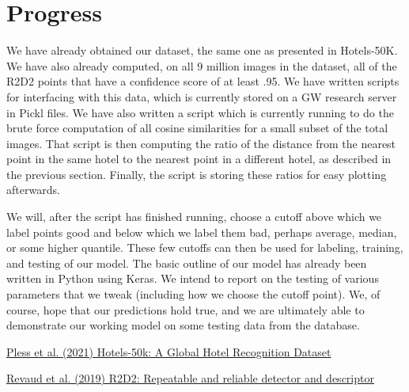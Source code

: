 \documentclass{scrartcl}
\begin{document}
\section{Progress}

We have already obtained our dataset, the same one as presented in Hotels-50K. We have also already computed, on all 9 million images in the dataset, all of the R2D2 points that have a confidence score of at least .95. We have written scripts for interfacing with this data, which is currently stored on a GW research server in Pickl files. We have also written a script which is currently running to do the brute force computation of all cosine similarities for a small subset of the total images. That script is then computing the ratio of the distance from the nearest point in the same hotel to the nearest point in a different hotel, as described in the previous section. Finally, the script is storing these ratios for easy plotting afterwards. 

We will, after the script has finished running, choose a cutoff above which we label points good and below which we label them bad, perhaps average, median, or some higher quantile. These few cutoffs can then be used for labeling, training, and testing of our model. The basic outline of our model has already been written in Python using Keras. We intend to report on the testing of various parameters that we tweak (including how we choose the cutoff point). We, of course, hope that our predictions hold true, and we are ultimately able to demonstrate our working model on some testing data from the database.

\begin{thebibliography}{9}
\href{https://www2.seas.gwu.edu/~pless/papers/Hotels50k.pdf}{
Pless et al. (2021) Hotels-50k: A Global Hotel Recognition Dataset
}

\href{https://europe.naverlabs.com/research/publications/r2d2-reliable-and-repeatable-detectors-and-descriptors-for-joint-sparse-local-keypoint-detection-and-feature-extraction/}{
Revaud et al. (2019) R2D2: Repeatable and reliable detector and descriptor
}

\end{thebibliography}
\end{document}
